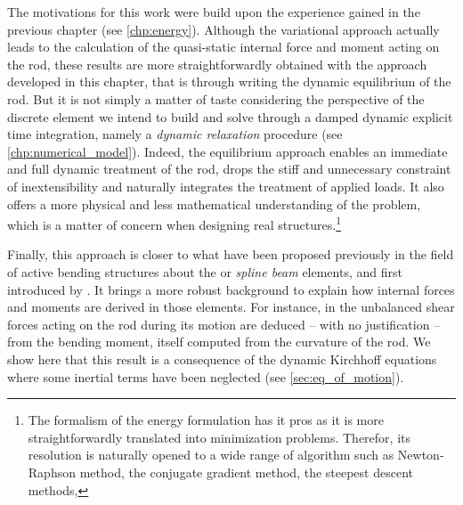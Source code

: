 The motivations for this work were build upon the experience gained in the previous chapter (see \cref{chp:energy}). Although the variational approach actually leads to the calculation of the quasi-static internal force and moment acting on the rod, these results are more straightforwardly obtained with the approach developed in this chapter, that is through writing the dynamic equilibrium of the rod. But it is not simply a matter of taste considering the perspective of the discrete element we intend to build and solve through a damped dynamic explicit time integration, namely a \emph{dynamic relaxation} procedure (see \cref{chp:numerical_model}). Indeed, the equilibrium approach enables an immediate and full dynamic treatment of the rod, drops the stiff and unnecessary constraint of inextensibility and naturally integrates the treatment of applied loads. It also offers a more physical and less mathematical understanding of the problem, which is a matter of concern when designing real structures.\footnote{The formalism of the energy formulation has it pros as it is more straightforwardly translated into minimization problems. Therefor, its resolution is naturally opened to a wide range of algorithm such as Newton-Raphson method, the conjugate gradient method, the steepest descent methods, \telp{}}

Finally, this approach is closer  to what have been proposed previously in the field of active bending structures about the  or  \emph{spline beam} elements, and first introduced by . It brings a more robust background to explain how internal forces and moments are derived in those elements. For instance, in \cite{Adriaenssens2001,Douthe2006,DAmico2014} the unbalanced shear forces acting on the rod during its motion are deduced -- with no justification -- from the bending moment, itself computed from the curvature of the rod. We show here that this result is a consequence of the dynamic Kirchhoff equations where some inertial terms have been neglected (see \cref{sec:eq_of_motion}).



